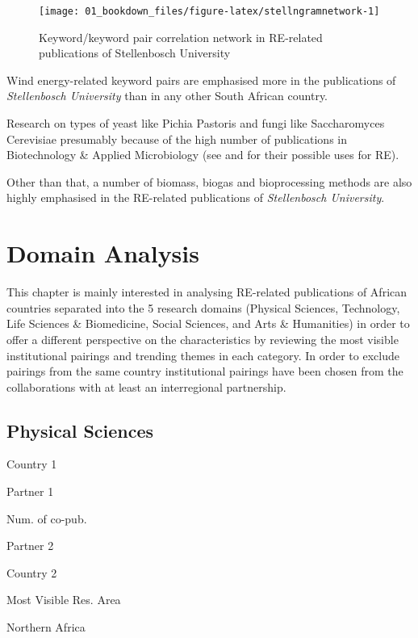 \documentclass[
]{book}
\begin{document}
\begin{figure}
\texttt{[image: 01\_bookdown\_files/figure-latex/stellngramnetwork-1]} \caption{Keyword/keyword pair correlation network in RE-related publications of Stellenbosch University }\label{fig:stellngramnetwork}
\end{figure}

Wind energy-related keyword pairs are emphasised more in the publications of \emph{Stellenbosch University} than in any other South African country.

Research on types of yeast like Pichia Pastoris and fungi like Saccharomyces Cerevisiae presumably because of the high number of publications in Biotechnology \& Applied Microbiology (see \citet{benjamin2020} and \citet{siripong2018} for their possible uses for RE).

Other than that, a number of biomass, biogas and bioprocessing methods are also highly emphasised in the RE-related publications of \emph{Stellenbosch University}.

\hypertarget{domain-analysis}{%
\section{Domain Analysis}\label{domain-analysis}}

This chapter is mainly interested in analysing RE-related publications of African countries separated into the 5 research domains (Physical Sciences, Technology, Life Sciences \& Biomedicine, Social Sciences, and Arts \& Humanities) in order to offer a different perspective on the characteristics by reviewing the most visible institutional pairings and trending themes in each category. In order to exclude pairings from the same country institutional pairings have been chosen from the collaborations with at least an interregional partnership.

\hypertarget{physical-sciences}{%
\subsection{Physical Sciences}\label{physical-sciences}}

Country 1

Partner 1

Num. of co-pub.

Partner 2

Country 2

Most Visible Res. Area

Northern Africa
\end{document}

